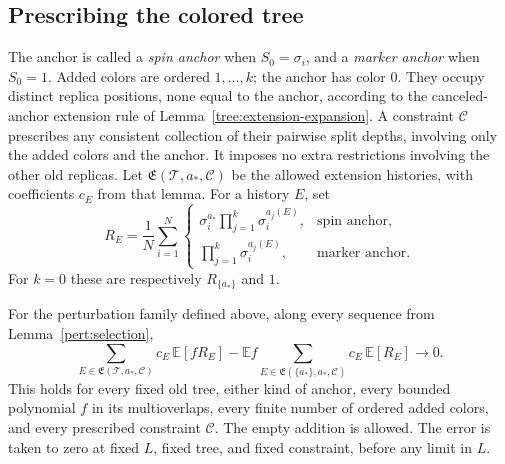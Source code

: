 \subsection{Prescribing the colored tree}

The anchor is called a \emph{spin anchor} when $S_0=\sigma_i$, and a
\emph{marker anchor} when $S_0=1$.  Added colors are ordered
$1,\ldots,k$; the anchor has color $0$.  They occupy distinct replica
positions, none equal to the anchor, according to the canceled-anchor
extension rule of Lemma~\ref{tree:extension-expansion}.  A constraint
$\mathcal C$ prescribes any consistent collection of their pairwise
split depths, involving only the added colors and the anchor.
It imposes no extra restrictions involving the other old replicas.
Let $\mathfrak E(\mathcal T,a_*,\mathcal C)$ be the allowed extension
histories, with coefficients $c_E$ from that lemma.  For a history
$E$, set
\[
 R_E=\frac1N\sum_{i=1}^N
 \begin{cases}
 \displaystyle\sigma_i^{a_*}\prod_{j=1}^k\sigma_i^{a_j(E)},
       &\text{spin anchor},\\[2pt]
 \displaystyle\prod_{j=1}^k\sigma_i^{a_j(E)},
       &\text{marker anchor}.
 \end{cases}
\]
For $k=0$ these are respectively $R_{\{a_*\}}$ and $1$.

\begin{theorem}
\label{pert:tree-identity}
\label{pert:identity}
For the perturbation family defined above, along every sequence from
Lemma~\ref{pert:selection},
\begin{equation}
 \sum_{E\in\mathfrak E(\mathcal T,a_*,\mathcal C)}
       c_E\,\mathbb E[fR_E]
 -\mathbb E f
  \sum_{E\in\mathfrak E(\{a_*\},a_*,\mathcal C)}
       c_E\,\mathbb E[R_E]
 \longrightarrow0.
 \label{pert:tree-identity-eq}
\end{equation}
This holds for every fixed old tree, either kind of anchor, every
bounded polynomial $f$ in its multioverlaps, every finite number of
ordered added colors, and every prescribed constraint $\mathcal C$.
The empty addition is allowed.  The error is taken to zero at fixed
$L$, fixed tree, and fixed constraint, before any limit in $L$.
\end{theorem}


